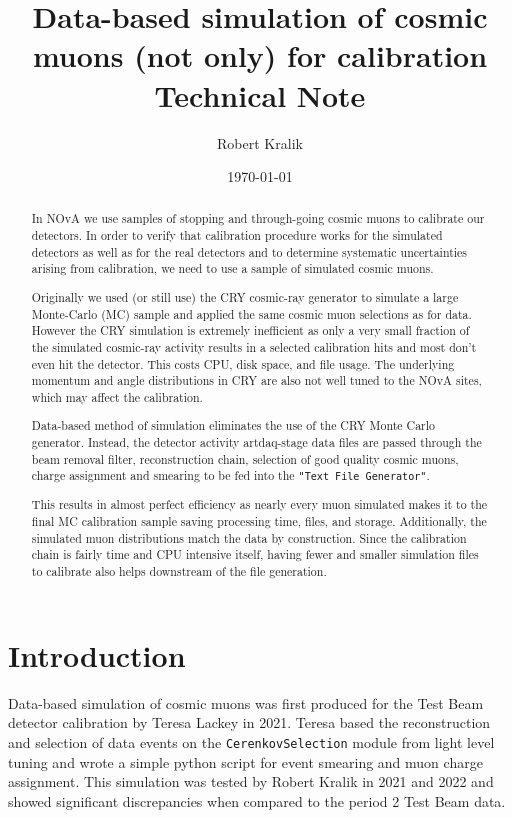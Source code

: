 \documentclass[12pt]{article}
\author{Robert Kralik}
\title{\textbf{Data-based simulation of cosmic muons (not only) for calibration\\ \vspace*{5mm}
\Large{Technical Note}}}
\date{\today}
\begin{document}
\maketitle
\begin{abstract}
In NOvA we use samples of stopping and through-going cosmic muons to calibrate our detectors. In order to verify that calibration procedure works for the simulated detectors as well as for the real detectors and to determine systematic uncertainties arising from calibration, we need to use a sample of simulated cosmic muons.

Originally we used (or still use) the CRY cosmic-ray generator to simulate a large Monte-Carlo (MC) sample and applied the same cosmic muon selections as for data. However the CRY simulation is extremely inefficient as only a very small fraction of the simulated cosmic-ray activity results in a selected calibration hits and most don't even hit the detector. This costs CPU, disk space, and file usage. The underlying momentum and angle distributions in CRY are also not well tuned to the NOvA sites, which may affect the calibration.

Data-based method of simulation eliminates the use of the CRY Monte Carlo generator. Instead, the detector activity artdaq-stage data files are passed through the beam removal filter, reconstruction chain, selection of good quality cosmic muons, charge assignment and smearing to be fed into the \texttt{"Text File Generator"}. 

This results in almost perfect efficiency as nearly every muon simulated makes it to the final MC calibration sample saving processing time, files, and storage. Additionally, the simulated muon distributions match the data by construction. Since the calibration chain is fairly time and CPU intensive itself, having fewer and smaller simulation files to calibrate also helps downstream of the file generation.
\end{abstract}

\newpage
\tableofcontents

\section{Introduction}
Data-based simulation of cosmic muons was first produced for the Test Beam detector calibration by Teresa Lackey in 2021. Teresa based the reconstruction and selection of data events on the \texttt{CerenkovSelection} module from light level tuning and wrote a simple python script for event smearing and muon charge assignment. This simulation was tested by Robert Kralik in 2021 and 2022 and showed significant discrepancies when compared to the period 2 Test Beam data.
\end{document}
